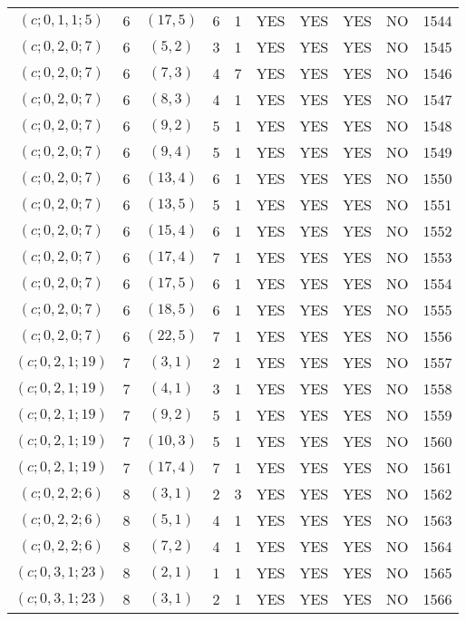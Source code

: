 \begin{longtable}{|c|c|c|c|c|c|c|c|c|c|}
$(c; 0, 1, 1; 5)$ & 6 & $(17, 5)$ & 6 & 1 & YES & YES & YES & NO & 1544\\
$(c; 0, 2, 0; 7)$ & 6 & $(5, 2)$ & 3 & 1 & YES & YES & YES & NO & 1545\\
$(c; 0, 2, 0; 7)$ & 6 & $(7, 3)$ & 4 & 7 & YES & YES & YES & NO & 1546\\
$(c; 0, 2, 0; 7)$ & 6 & $(8, 3)$ & 4 & 1 & YES & YES & YES & NO & 1547\\
$(c; 0, 2, 0; 7)$ & 6 & $(9, 2)$ & 5 & 1 & YES & YES & YES & NO & 1548\\
$(c; 0, 2, 0; 7)$ & 6 & $(9, 4)$ & 5 & 1 & YES & YES & YES & NO & 1549\\
$(c; 0, 2, 0; 7)$ & 6 & $(13, 4)$ & 6 & 1 & YES & YES & YES & NO & 1550\\
$(c; 0, 2, 0; 7)$ & 6 & $(13, 5)$ & 5 & 1 & YES & YES & YES & NO & 1551\\
$(c; 0, 2, 0; 7)$ & 6 & $(15, 4)$ & 6 & 1 & YES & YES & YES & NO & 1552\\
$(c; 0, 2, 0; 7)$ & 6 & $(17, 4)$ & 7 & 1 & YES & YES & YES & NO & 1553\\
$(c; 0, 2, 0; 7)$ & 6 & $(17, 5)$ & 6 & 1 & YES & YES & YES & NO & 1554\\
$(c; 0, 2, 0; 7)$ & 6 & $(18, 5)$ & 6 & 1 & YES & YES & YES & NO & 1555\\
$(c; 0, 2, 0; 7)$ & 6 & $(22, 5)$ & 7 & 1 & YES & YES & YES & NO & 1556\\
$(c; 0, 2, 1; 19)$ & 7 & $(3, 1)$ & 2 & 1 & YES & YES & YES & NO & 1557\\
$(c; 0, 2, 1; 19)$ & 7 & $(4, 1)$ & 3 & 1 & YES & YES & YES & NO & 1558\\
$(c; 0, 2, 1; 19)$ & 7 & $(9, 2)$ & 5 & 1 & YES & YES & YES & NO & 1559\\
$(c; 0, 2, 1; 19)$ & 7 & $(10, 3)$ & 5 & 1 & YES & YES & YES & NO & 1560\\
$(c; 0, 2, 1; 19)$ & 7 & $(17, 4)$ & 7 & 1 & YES & YES & YES & NO & 1561\\
$(c; 0, 2, 2; 6)$ & 8 & $(3, 1)$ & 2 & 3 & YES & YES & YES & NO & 1562\\
$(c; 0, 2, 2; 6)$ & 8 & $(5, 1)$ & 4 & 1 & YES & YES & YES & NO & 1563\\
$(c; 0, 2, 2; 6)$ & 8 & $(7, 2)$ & 4 & 1 & YES & YES & YES & NO & 1564\\
$(c; 0, 3, 1; 23)$ & 8 & $(2, 1)$ & 1 & 1 & YES & YES & YES & NO & 1565\\
$(c; 0, 3, 1; 23)$ & 8 & $(3, 1)$ & 2 & 1 & YES & YES & YES & NO & 1566\\

\end{longtable}
